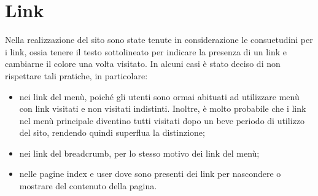\section{Link}
Nella realizzazione del sito sono state tenute in considerazione le consuetudini per i link, ossia tenere il testo sottolineato per indicare la presenza di un link e cambiarne il colore una volta visitato. In alcuni casi è stato deciso di non rispettare tali pratiche, in particolare:
\begin{itemize}
	\item nei link del menù, poiché gli utenti sono ormai abituati ad utilizzare menù con link visitati e non visitati indistinti. Inoltre, è molto probabile che i link nel menù principale diventino tutti visitati dopo un beve periodo di utilizzo del sito, rendendo quindi superflua la distinzione;
	\item nei link del breadcrumb, per lo stesso motivo dei link del menù;
	\item nelle pagine index e user dove sono presenti dei link per nascondere o mostrare del contenuto della pagina.
\end{itemize}
